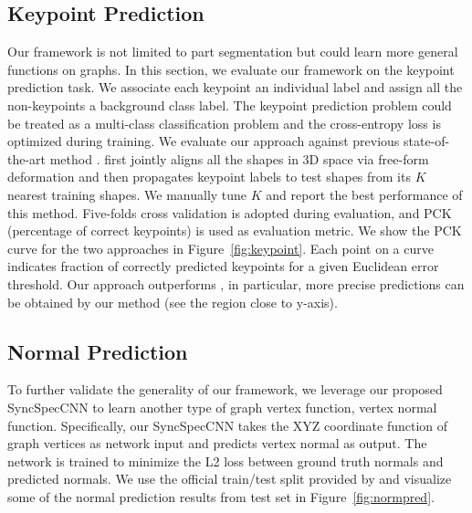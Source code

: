 \subsection{Keypoint Prediction}
Our framework is not limited to part segmentation but could learn more general functions on graphs. In this section, we evaluate our framework on the keypoint prediction task. We associate each keypoint an individual label and assign all the non-keypoints a background class label. The keypoint prediction problem could be treated as a multi-class classification problem and the cross-entropy loss is optimized during training. We evaluate our approach against previous state-of-the-art method \cite{huang2013fine}. \cite{huang2013fine} first jointly aligns all the shapes in 3D space via free-form deformation and then propagates keypoint labels to test shapes from its $K$ nearest training shapes. We manually tune $K$ and report the best performance of this method. Five-folds cross validation is adopted during evaluation, and PCK (percentage of correct keypoints) is used as evaluation metric. We show the PCK curve for the two approaches in Figure~\ref{fig:keypoint}. Each point on a curve indicates fraction of correctly predicted keypoints for a given Euclidean error threshold. Our approach outperforms \cite{huang2013fine}, in particular, more precise predictions can be obtained by our method (see the region close to y-axis).

\subsection{Normal Prediction}
\label{sec:normal}
To further validate the generality of our framework, we leverage our proposed SyncSpecCNN to learn another type of graph vertex function, vertex normal function. Specifically, our SyncSpecCNN takes the XYZ coordinate function of graph vertices as network input and predicts vertex normal as output. The network is trained to minimize the L2 loss between ground truth normals and predicted normals. We use the official train/test split provided by \cite{shapenet2015} and visualize some of the normal prediction results from test set in Figure~\ref{fig:normpred}.


